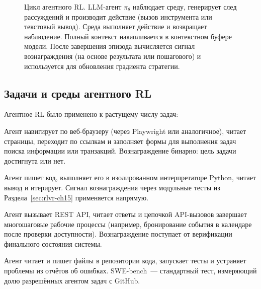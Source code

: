 \begin{figure}[ht]
\caption{Цикл агентного RL. LLM-агент $\pi_\theta$ наблюдает
  среду, генерирует след рассуждений и производит действие (вызов
  инструмента или текстовый вывод). Среда выполняет действие и
  возвращает наблюдение. Полный контекст накапливается в контекстном
  буфере модели. После завершения эпизода вычисляется сигнал вознаграждения
  (на основе результата или пошагового) и используется для обновления градиента стратегии.}
\label{fig:agent-loop}
\end{figure}

\subsection{Задачи и среды агентного RL}
\label{subsec:agentic-tasks}

Агентное RL было применено к растущему числу задач:

\begin{description}[leftmargin=!,labelwidth=3.5cm]
\item[Браузинг веба] Агент навигирует по веб-браузеру (через Playwright
  или аналогичное), читает страницы, переходит по ссылкам и заполняет формы для
  выполнения задач поиска информации или транзакций. Вознаграждение
  бинарно: цель задачи достигнута или нет.

\item[Выполнение кода] Агент пишет код, выполняет его в
  изолированном интерпретаторе Python, читает вывод и итерирует. Сигнал
  вознаграждения через модульные тесты из Раздела~\ref{sec:rlvr-ch15} применяется
  напрямую.

\item[Взаимодействие с API] Агент вызывает REST API, читает ответы
  и цепочкой API-вызовов завершает многошаговые рабочие процессы (например, бронирование
  события в календаре после проверки доступности). Вознаграждение поступает от
  верификации финального состояния системы.

\item[Кодирование на уровне репозитория] Агент читает и пишет файлы в
  репозитории кода, запускает тесты и устраняет проблемы из отчётов об ошибках.
  SWE-bench~--- стандартный тест, измеряющий
  долю разрешённых агентом задач с GitHub.
\end{description}


